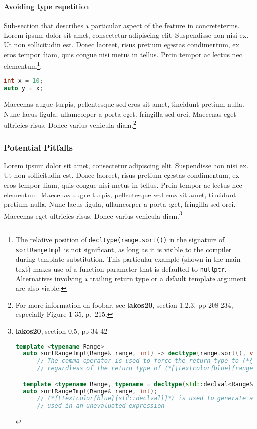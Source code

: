 \documentclass[twoside,10pt,letterpaper,usenames]{newstyle-PearsonGeneric-7-38}
\begin{document}
\paragraph[Avoiding type repetition]{Avoiding type repetition}\label{avoiding-type-repetition}

Sub-section that describes a particular aspect of the feature in
concreteterms. Lorem ipsum dolor sit amet, consectetur adipiscing elit.
Suspendisse non nisi ex. Ut non sollicitudin est. Donec laoreet, risus
pretium egestas condimentum, ex eros tempor diam, quis congue nisi metus
in tellus. Proin tempor ac lectus nec elementum{\cprotect\footnote{The
  relative position of \texttt{decltype(range.sort())} in the signature
  of \texttt{sortRangeImpl} is not significant, as long as it is visible
  to the compiler during template substitution. This particular example
  (shown in the main text) makes use of a function parameter that is
  defaulted to \texttt{nullptr}. Alternatives involving a trailing
  return type or a default template argument are also viable:}}.

\begin{lstlisting}[language=C++]
int x = 10;
auto y = x;
\end{lstlisting}
    

Maecenas augue turpis, pellentesque sed eros sit amet, tincidunt pretium
nulla. Nunc lacus ligula, ullamcorper a porta eget, fringilla sed orci.
Maecenas eget ultricies risus. Donec varius vehicula
diam.{\cprotect\footnote{For more information on foobar, see
  \textbf{lakos20}, section 1.2.3, pp 208-234, especially Figure 1-35,
  p.~215.}}

\subsubsection[Potential Pitfalls]{Potential Pitfalls}\label{potential-pitfalls}

Lorem ipsum dolor sit amet, consectetur adipiscing elit. Suspendisse non
nisi ex. Ut non sollicitudin est. Donec laoreet, risus pretium egestas
condimentum, ex eros tempor diam, quis congue nisi metus in tellus.
Proin tempor ac lectus nec elementum. Maecenas augue turpis,
pellentesque sed eros sit amet, tincidunt pretium nulla. Nunc lacus
ligula, ullamcorper a porta eget, fringilla sed orci. Maecenas eget
ultricies risus. Donec varius vehicula diam.{\cprotect\footnote{\textbf{lakos20},
  section 0.5, pp 34-42

  \begin{lstlisting}[language=C++, basicstyle={\ttfamily\footnotesize}]
  template <typename Range>
  auto sortRangeImpl(Range& range, int) -> decltype(range.sort(), void());
      // The comma operator is used to force the return type to (*{\textcolor{blue}{void}}*),
      // regardless of the return type of (*{\textcolor{blue}{range.sort()}}*).

  template <typename Range, typename = decltype(std::declval<Range&>().sort()>
  auto sortRangeImpl(Range& range, int);
      // (*{\textcolor{blue}{std::declval}}*) is used to generate a reference to (*{\textcolor{blue}{Range}}*) that can be
      // used in an unevaluated expression
  \end{lstlisting}
      }}
\end{document}
